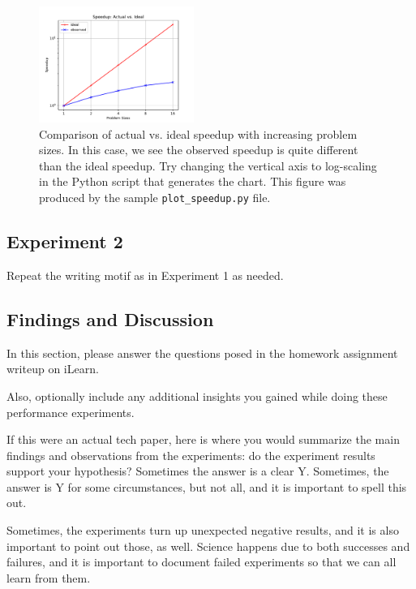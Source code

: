 \begin{figure}
    \centering
    \includegraphics[width=0.45\textwidth]{Figure_1.pdf}
    \caption{Comparison of actual vs. ideal speedup with increasing problem sizes. In this case, we see the observed speedup is quite different than the ideal speedup. Try changing the vertical axis to log-scaling in the Python script that generates the chart. This figure was produced by the sample \texttt{plot\_speedup.py} file.}
    \label{fig:MyPlot1}
\end{figure}

\subsection{Experiment 2}

Repeat the writing motif as in Experiment 1 as needed.

\subsection{Findings and Discussion}

In this section, please answer the questions posed in the homework assignment writeup on iLearn.

Also, optionally include any additional insights you gained while doing these performance experiments.

If this were an actual tech paper, here is where you would summarize the main findings and observations from the experiments: do the experiment results support your hypothesis? Sometimes the answer is a clear Y. Sometimes, the answer is Y for some circumstances, but not all, and it is important to spell this out.

Sometimes, the experiments turn up unexpected negative results, and it is also important to point out those, as well. Science happens due to both successes and failures, and it is important to document failed experiments so that we can all learn from them.


